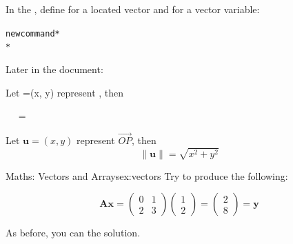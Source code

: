 In the , define  for a
located vector and  for a vector variable:
\begin{code}
\begin{alltt}
\gls{newcommand}*
*
\end{alltt}
\end{code}
Later in the document:
\begin{code}
Let =(x, y)
represent , then\newline
{}\newline
\strut~~  
    = \newline
{}
\end{code}
\begin{result}
\newcommand*{\lvec}[1]{\overrightarrow{#1}}%
\newcommand*{\bvec}[1]{\boldsymbol{#1}}%
Let $\bvec{u}=(x, y)$ represent $\lvec{OP}$, then
\[
  \lVert \bvec{u} \rVert = \sqrt{x^2 + y^2}
\]
\end{result}
\bookpagebreak

\begin{exercise}{Maths: Vectors and Arrays}{ex:vectors}
Try to produce the following:
\renewcommand{\vec}[1]{\boldsymbol{#1}}
\begin{result}
\[
\boldsymbol{A}\vec{x} =
\begin{pmatrix}
0 & 1\\
2 & 3
\end{pmatrix}
\begin{pmatrix}
1\\
2
\end{pmatrix}
=
\begin{pmatrix}
2\\
8
\end{pmatrix}
= \vec{y}
\]
\end{result}%
As before, you can  the solution.
\end{exercise}


